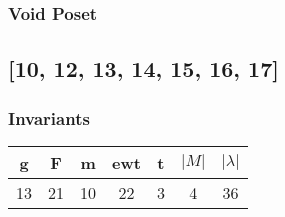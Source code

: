 \documentclass[a4paper]{article}
\begin{document}
\hfill\begin{minipage}{0.48\textwidth}
\subsubsection*{Void Poset}
\centering
\end{minipage}
\newpage\subsection{[10, 12, 13, 14, 15, 16, 17]}
\noindent\begin{minipage}{0.6\textwidth}
\subsubsection*{Invariants}
\centering
\begin{tabular}{|c|c|c|c|c|c|c|}
\toprule
g & F & m & ewt & t & \(|M|\) & \(|\lambda|\) \\
\midrule
13 & 21 & 10 & 22 & 3 & 4 & 36 \\
\bottomrule
\end{tabular}
\end{minipage}%
\end{document}
